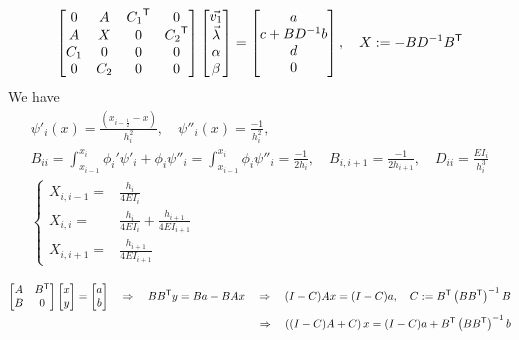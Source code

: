%
\begin{align*}
\begin{bmatrix}
0 & {A}& {C_1}^{\mathsf{T}}&0\\
A & X& 0&{C_2}^{\mathsf{T}}\\
C_1 & 0  & 0& 0\\
0 & C_2  & 0& 0
\end{bmatrix}
\begin{bmatrix}
\vec{v_1} \\ \vec{\lambda}\\ \alpha \\ \beta
\end{bmatrix}
=
\begin{bmatrix}
a  \\ c+ BD^{-1}b\\ d\\0
\end{bmatrix},\quad X:= -BD^{-1}{B}^{\mathsf{T}}
\end{align*}
%
We have
%
\begin{align*}
\psi'_i(x)=\frac{(x_{i-\frac12} -x)}{h_i^2},\quad
\psi''_i(x)=\frac{-1}{h_i^2},\\
B_{ii} = \int_{x_{i-1}}^{x_i} \phi_i'\psi'_i+\phi_i\psi''_i = \int_{x_{i-1}}^{x_i} \phi_i\psi''_i = \frac{-1}{2h_i},\quad
B_{i,i+1} = \frac{-1}{2h_{i+1}}, \quad D_{ii} = \frac{EI_i}{h_i^3}\\
%
\left\{
\begin{aligned}
X_{i,i-1} =& \frac{h_i}{4EI_i}\\
X_{i,i} =& \frac{h_i}{4EI_i}+\frac{h_{i+1}}{4EI_{i+1}}\\
X_{i,i+1} =& \frac{h_{i+1}}{4EI_{i+1}}
\end{aligned}
\right.
%
\end{align*}
%

\begin{align*}
\begin{bmatrix}
A & {B}^{\mathsf{T}}\\
B & 0
\end{bmatrix}
\begin{bmatrix}
x\\y
\end{bmatrix}
=
\begin{bmatrix}
a  \\ b
\end{bmatrix}
\quad\Rightarrow\quad 
B{B}^{\mathsf{T}}y = Ba- BA x
\quad\Rightarrow\quad 
(I-C)Ax = (I-C)a,\quad C:={B}^{\mathsf{T}}\left(B{B}^{\mathsf{T}}\right)^{-1}B\\
\quad\Rightarrow\quad 
\left((I-C)A + C \right)x = (I-C)a + {B}^{\mathsf{T}}\left(B{B}^{\mathsf{T}}\right)^{-1}b
\end{align*}


%
%
\printbibliography[title=References Section~\thesection]
